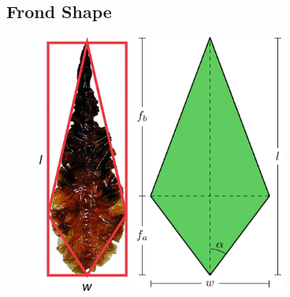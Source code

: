 \documentclass[ms,cpyr,lof,lot]{uathesis}
\begin{document}
\subsection{Frond Shape}
\label{sec:shape}

\begin{figure}[h]
	\centering
  \includegraphics[width=1.2in]{kelp_photo/kite}
  \qquad
	\includegraphics[width=2in]{frond}
	\label{fig:frond}
\end{figure}
\end{document}

